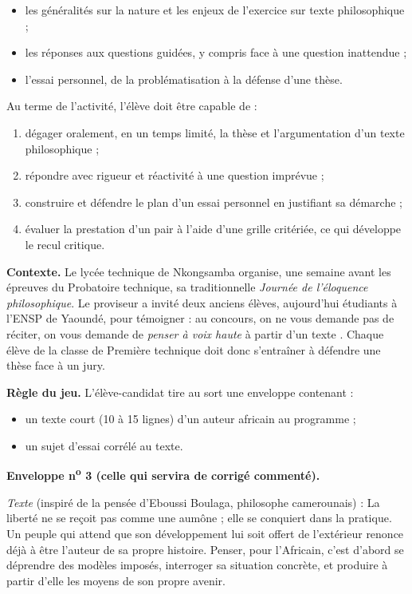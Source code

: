 \documentclass[11pt]{article}
\newcommand{\cle}[1]{{\popxbold\color{popdark}#1}}
\newcounter{popsec}
\newcounter{popsub}
\newcommand{\courssub}[1]{%
  \stepcounter{popsub}%
  \par\vspace{9pt}\noindent{\popxbold\fontsize{11.5}{13}\selectfont\color{popink}{\color{poporange}\thepopsec.\thepopsub}\hspace{6pt}#1}\par\nopagebreak\vspace{4pt}
}
\begin{document}
\begin{itemize}
\item les \cle{généralités} sur la nature et les enjeux de l'exercice sur texte philosophique ;
\item les \cle{réponses aux questions} guidées, y compris face à une question inattendue ;
\item l'\cle{essai personnel}, de la problématisation à la défense d'une thèse.
\end{itemize}

Au terme de l'activité, l'élève doit être capable de :
\begin{enumerate}
\item dégager oralement, en un temps limité, la thèse et l'argumentation d'un texte philosophique ;
\item répondre avec rigueur et réactivité à une question imprévue ;
\item construire et défendre le plan d'un essai personnel en justifiant sa démarche ;
\item évaluer la prestation d'un pair à l'aide d'une grille critériée, ce qui développe le recul critique.
\end{enumerate}

\courssub{Situation}

\textbf{Contexte.} Le lycée technique de Nkongsamba organise, une semaine avant les épreuves du Probatoire technique, sa traditionnelle \emph{Journée de l'éloquence philosophique}. Le proviseur a invité deux anciens élèves, aujourd'hui étudiants à l'ENSP de Yaoundé, pour témoigner : \og au concours, on ne vous demande pas de réciter, on vous demande de \emph{penser à voix haute} à partir d'un texte \fg. Chaque élève de la classe de Première technique doit donc s'entraîner à défendre une thèse face à un jury.

\textbf{Règle du jeu.} L'élève-candidat tire au sort une enveloppe contenant :
\begin{itemize}
\item un \cle{texte court} (10 à 15 lignes) d'un auteur africain au programme ;
\item un \cle{sujet d'essai} corrélé au texte.
\end{itemize}

\textbf{Enveloppe n\textsuperscript{o} 3 (celle qui servira de corrigé commenté).}

\emph{Texte} (inspiré de la pensée d'Eboussi Boulaga, philosophe camerounais) : \og La liberté ne se reçoit pas comme une aumône ; elle se conquiert dans la pratique. Un peuple qui attend que son développement lui soit offert de l'extérieur renonce déjà à être l'auteur de sa propre histoire. Penser, pour l'Africain, c'est d'abord se déprendre des modèles imposés, interroger sa situation concrète, et produire à partir d'elle les moyens de son propre avenir. \fg
\end{document}
